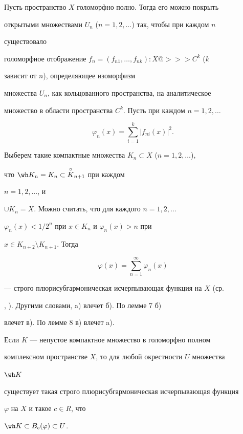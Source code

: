 \begin{pf} 


Пусть пространство $X$ голоморфно полно. Тогда его можно покрыть 


открытыми множествами $U_n$ ($n=1,2,\dotsc$) так, чтобы при каждом $n$ 


существовало 


голоморфное отображение $f_n=(f_{n1},\dotsc,f_{nk}):X@>>>C^k$ ($k$ 


зависит от $n$), определяющее изоморфизм 


множества $U_n$, как кольцованного пространства, на аналитическое 


множество в области пространства $C^k$. Пусть при каждом $n=1,2,\dotsc$ 


$$ 


\varphi_n(x)=\sum^k_{i=1}|f_{ni}(x)|^2. 


$$ 


Выберем такие компактные множества $K_n\subset X$ ($n=1,2,\dotsc$), 


что $\wh K_n=K_n\subset\overset{\circ}{K}{}_{n+1}$ при каждом 


$n=1,2,\dotsc$, и 


$\cup K_n=X$. Можно считать, что для каждого $n=1,2,\dotsc$\; 


$\varphi_n(x)<1/2^n$ при $x\in K_n$ и $\varphi_n(x)>n$ при 


$x\in K_{n+2}\setminus K_{n+1}$. Тогда 


$$ 


\varphi(x)=\sum^\infty_{n=1}\varphi_n(x) 


$$ 


--- строго плюрисубгармоническая исчерпывающая функция на $X$ (ср. 


\cite{4}, \cite{5}). Другими словами, a) влечет б). По лемме 7\; б) 


влечет в). По лемме 8\; в) влечет a). 


\end{pf} 


 


\begin{lem} 


Если $K$ --- непустое компактное множество в голоморфно полном 


комплексном пространстве $X$, то для любой окрестности $U$ множества 


$\wh K$ 


существует такая строго плюрисубгармоническая исчерпывающая функция 


$\varphi$ на $X$ и такое $c\in R$, что 


$\wh K\subset B_c(\varphi)\subset U$. 


\end{lem} 



